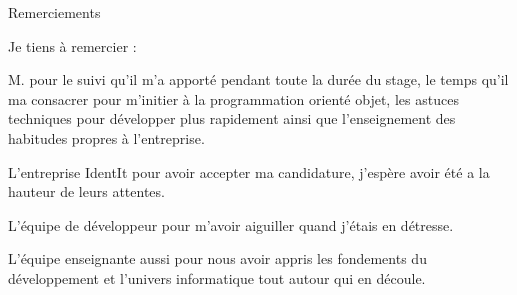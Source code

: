 Remerciements

Je tiens à remercier :

M. pour le suivi qu'il m'a apporté pendant toute la durée du stage, le temps qu'il ma consacrer pour m'initier à la programmation orienté objet, les astuces techniques pour développer plus rapidement ainsi que l'enseignement des habitudes propres à l'entreprise.

L'entreprise IdentIt pour avoir accepter ma candidature, j'espère avoir été a la hauteur de leurs attentes.

L'équipe de développeur pour m'avoir aiguiller quand j'étais en détresse.

L'équipe enseignante aussi pour nous avoir appris les fondements du développement et l'univers informatique tout autour qui en découle.


